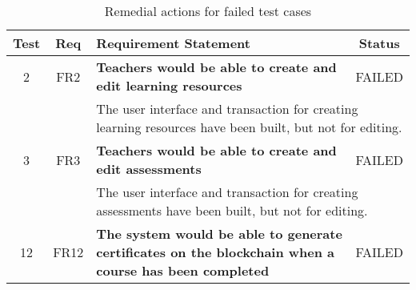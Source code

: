 \begin{table}[!ht]
	\caption{Remedial actions for failed test cases}
	\label{table:failed_tests}
	\begin{tabularx}{\textwidth}{|c|c|X|c|}
		\hline
		Test                                                              & Req                     & Requirement Statement                                                                                                                                 & Status                  \\
		\hline
		2                                                                 & FR2                     & \textbf{Teachers would be able to create and edit learning resources}                                                                                 & \cellcolor{pink}FAILED  \\
		\hline
		                                                                  &                         & \multicolumn{2}{X|}{The user interface and transaction for creating learning resources have been built,
			but not for editing.}                                                                                                                                                                                                                                                         \\
		\hline
		3                                                                 & FR3                     & \textbf{Teachers would be able to create and edit assessments}                                                                                        & \cellcolor{pink}FAILED  \\
		\hline
		                                                                  &                         & \multicolumn{2}{X|}{The user interface and transaction for creating assessments have been built,
			but not for editing.}                                                                                                                                                                                                                                                         \\
		\hline
		12                                                                & FR12                    & \textbf{The system would be able to generate certificates on
		the blockchain when a course has been completed}                  & \cellcolor{pink}FAILED                                                                                                                                                                                    \\

\end{tabularx}
\end{table}
